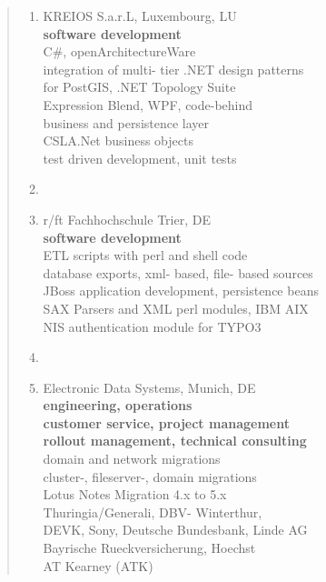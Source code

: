 \documentclass[a4paper]{report}
\begin{document}
\begin{quote}
\begin{enumerate}

\item[2007]         KREIOS S.a.r.L, Luxembourg, LU\\
                    \textbf{software development}\\
                    C\#, openArchitectureWare\\
                    integration of multi- tier .NET design patterns\\
                    for PostGIS, .NET Topology Suite\\
                    Expression Blend, WPF, code-behind\\
                    business and persistence layer\\
                    CSLA.Net business objects\\
                    test driven development, unit tests

\item[ ]

\item[2004 - 2006]  r/ft Fachhochschule Trier, DE\\
                    \textbf{software development}\\
                    ETL scripts with perl and shell code\\
                    database exports, xml- based, file- based sources\\
                    JBoss application development, persistence beans\\
                    SAX Parsers and XML perl modules, IBM AIX\\
                    NIS authentication module for TYPO3

\item[ ]

\item[1999 - 2004]  Electronic Data Systems, Munich, DE\\
                    \textbf{engineering, operations}\\
                    \textbf{customer service, project management}\\
                    \textbf{rollout management, technical consulting}\\
                    domain and network migrations\\
                    cluster-, fileserver-, domain migrations\\
                    Lotus Notes Migration 4.x to 5.x\\
                    Thuringia/Generali, DBV- Winterthur,\\
                    DEVK, Sony, Deutsche Bundesbank, Linde AG\\
                    Bayrische Rueckversicherung, Hoechst\\
                    AT Kearney (ATK)


\end{enumerate}
\end{quote}
\end{document}
